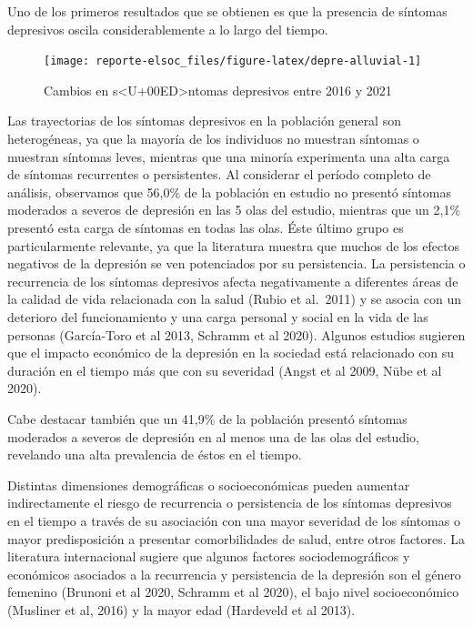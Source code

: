 \documentclass[
  12pt,
]{book}
\begin{document}
Uno de los primeros resultados que se obtienen es que la presencia de síntomas depresivos oscila considerablemente a lo largo del tiempo.

\begin{figure}

{\centering \texttt{[image: reporte-elsoc\_files/figure-latex/depre-alluvial-1]} 

}

\caption{Cambios en s<U+00ED>ntomas depresivos entre 2016 y 2021}\label{fig:depre-alluvial}
\end{figure}

Las trayectorias de los síntomas depresivos en la población general son heterogéneas, ya que la mayoría de los individuos no muestran síntomas o muestran síntomas leves, mientras que una minoría experimenta una alta carga de síntomas recurrentes o persistentes. Al considerar el período completo de análisis, observamos que 56,0\% de la población en estudio no presentó síntomas moderados a severos de depresión en las 5 olas del estudio, mientras que un 2,1\% presentó esta carga de síntomas en todas las olas. Éste último grupo es particularmente relevante, ya que la literatura muestra que muchos de los efectos negativos de la depresión se ven potenciados por su persistencia. La persistencia o recurrencia de los síntomas depresivos afecta negativamente a diferentes áreas de la calidad de vida relacionada con la salud (Rubio et al.~2011) y se asocia con un deterioro del funcionamiento y una carga personal y social en la vida de las personas (García-Toro et al 2013, Schramm et al 2020). Algunos estudios sugieren que el impacto económico de la depresión en la sociedad está relacionado con su duración en el tiempo más que con su severidad (Angst et al 2009, Nübe et al 2020).

Cabe destacar también que un 41,9\% de la población presentó síntomas moderados a severos de depresión en al menos una de las olas del estudio, revelando una alta prevalencia de éstos en el tiempo.

Distintas dimensiones demográficas o socioeconómicas pueden aumentar indirectamente el riesgo de recurrencia o persistencia de los síntomas depresivos en el tiempo a través de su asociación con una mayor severidad de los síntomas o mayor predisposición a presentar comorbilidades de salud, entre otros factores. La literatura internacional sugiere que algunos factores sociodemográficos y económicos asociados a la recurrencia y persistencia de la depresión son el género femenino (Brunoni et al 2020, Schramm et al 2020), el bajo nivel socioeconómico (Musliner et al, 2016) y la mayor edad (Hardeveld et al 2013).
\end{document}

